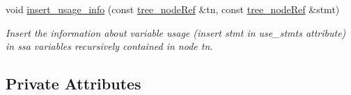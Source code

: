 \begin{DoxyCompactItemize}
void \hyperlink{classtree__manager_a3508317581f7ae086d2656abb90108e0}{insert\+\_\+usage\+\_\+info} (const \hyperlink{tree__node_8hpp_a6ee377554d1c4871ad66a337eaa67fd5}{tree\+\_\+node\+Ref} \&tn, const \hyperlink{tree__node_8hpp_a6ee377554d1c4871ad66a337eaa67fd5}{tree\+\_\+node\+Ref} \&stmt)
\begin{DoxyCompactList}\small\item\em Insert the information about variable usage (insert stmt in use\+\_\+stmts attribute) in ssa variables recursively contained in node tn. \end{DoxyCompactList}\end{DoxyCompactItemize}
\subsection*{Private Attributes}
